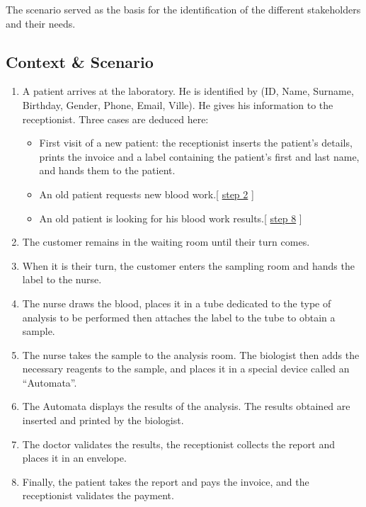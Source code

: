 \documentclass{article}
\begin{document}
The scenario served as the basis for the identification of the different stakeholders and their needs.


\subsection[Context \& Scenario]{Context \& Scenario}

\begin{enumerate}
    \item A patient arrives at the laboratory. He is identified by (ID, Name, Surname, Birthday, Gender, Phone, Email, Ville). He gives his information to the receptionist. 
    Three cases are deduced here:
    
    \begin{itemize}
        \item First visit of a new patient:
        the receptionist inserts the patient's details, prints the invoice and a label containing the patient's first and last name, and hands them to the patient.
        \item An old patient requests new blood work.[ \hyperref[step2]{step 2} ]
        \item An old patient is looking for his blood work results.[ \hyperref[step8]{step 8} ]
    \end{itemize}
    \item The customer remains in the waiting room until their turn comes.\label{step2}

    \item When it is their turn, the customer enters the sampling room and hands the label to the nurse.
    \item The nurse draws the blood, places it in a tube dedicated to the type of analysis to be performed then attaches the label to the tube to obtain a sample.
    \item The nurse takes the sample to the analysis room. The biologist then adds the necessary reagents to the sample, and places it in a special device called an “Automata”.
    \item The Automata displays the results of the analysis. The results obtained are inserted and printed by the biologist.
    \item The doctor validates the results, the receptionist collects the report and places it in an envelope.
    \item Finally, the patient takes the report and pays the invoice, and the receptionist validates the payment.\label{step8}
\end{enumerate}
\end{document}
